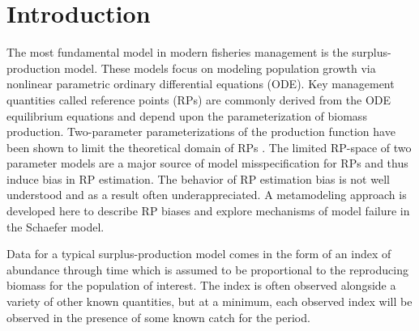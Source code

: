 \documentclass[12pt]{article}
\begin{document}
%
\clearpage

%
\section{Introduction\label{int}}

The most fundamental model in modern fisheries management is the surplus-production
model. These models focus on modeling population growth via nonlinear
parametric ordinary differential equations (ODE). Key management quantities
called reference points (RPs) are commonly derived from the ODE equilibrium
equations and depend upon the parameterization of biomass production.
Two-parameter parameterizations of the production function have been shown to
limit the theoretical domain of RPs . The
limited RP-space of two parameter models are a major source of model
misspecification for RPs and thus induce bias in RP estimation. The behavior
of RP estimation bias is not well understood and as a result often
underappreciated. A metamodeling approach is developed here to describe RP
biases and explore mechanisms of model failure in the Schaefer model.

Data for a typical surplus-production model comes in the form of an index
of abundance through time which is assumed to be proportional to the reproducing
biomass for the population of interest. The index is often observed alongside
a variety of other known quantities, but at a minimum, each observed index
will be observed in the presence of some known catch for the period.
\end{document}

